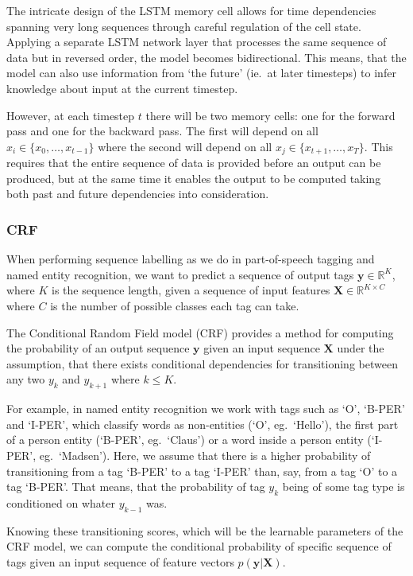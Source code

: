 The intricate design of the LSTM memory cell allows for time dependencies
spanning very long sequences through careful regulation of the cell state.
Applying a separate LSTM network layer that processes the same sequence of data
but in reversed order, the model becomes bidirectional. This means, that the
model can also use information from `the future' (ie.\ at later timesteps) to
infer knowledge about input at the current timestep.

However, at each timestep $t$ there will be two memory cells: one for the
forward pass and one for the backward pass. The first will depend on all $x_{i}
\in \{x_{0}, \ldots, x_{t-1}\}$ where the second will depend on all $x_{j} \in
\{x_{t+1}, \ldots, x_{T}\}$. This requires that the entire sequence of data is
provided before an output can be produced, but at the same time it enables the
output to be computed taking both past and future dependencies into
consideration.


\subsubsection{CRF}

When performing sequence labelling as we do in part-of-speech tagging and named
entity recognition, we want to predict a sequence of output tags $\bm{y} \in
\mathbb{R}^{K}$, where $K$ is the sequence length, given a sequence of input
features $\bm{X} \in \mathbb{R}^{K \times C}$ where $C$ is the number of
possible classes each tag can take.

The Conditional Random Field model (CRF) provides a method for computing the
probability of an output sequence $\bm{y}$ given an input sequence $\bm{X}$
under the assumption, that there exists conditional dependencies for
transitioning between any two $y_{k}$ and $y_{k+1}$ where $k \leq K$.

For example, in named entity recognition we work with tags such as `O', `B-PER'
and `I-PER', which classify words as non-entities (`O', eg.\ `Hello'), the first
part of a person entity (`B-PER', eg.\ `Claus') or a word inside a person entity
(`I-PER', eg.\ `Madsen'). Here, we assume that there is a higher probability of
transitioning from a tag `B-PER' to a tag `I-PER' than, say, from a tag `O' to a
tag `B-PER'.  That means, that the probability of tag $y_{k}$ being of some tag
type is conditioned on whater $y_{k-1}$ was.

Knowing these transitioning scores, which will be the learnable parameters of
the CRF model, we can compute the conditional probability of specific sequence
of tags given an input sequence of feature vectors $p(\bm{y}|\bm{X})$.

